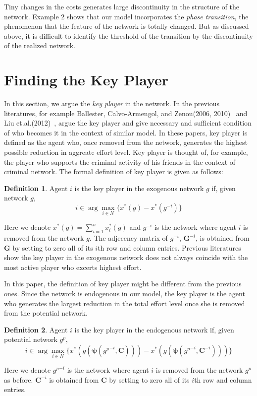 \documentclass[12pt]{article}
\theoremstyle{definition}
\newtheorem{definition}{Definition}
\begin{document}
Tiny changes in the costs generates large discontinuity in the structure of the network.
Example 2 shows that our model incorporates the {\it{phase transition}}, the phenomenon that the feature of the network is totally changed.
But as discussed above, it is difficult to identify the threshold of the transition by the discontinuity of the realized network.


\section{Finding the Key Player}

In this section, we argue the {\it{key player}} in the network.
In the previous literatures, for example Ballester, Calvo-Armengol, and Zenou(2006, 2010)~\cite{whowho, delinquent} and Liu et.al.(2012)~\cite{criminal}, argue the key player and give necessary and sufficient condition of who becomes it in the context of similar model.
In these papers, key player is defined as the agent who, once removed from the network, generates the highest possible reduction in aggreate effort level.
Key player is thought of, for example, the player who supports the criminal activity of his friends in the context of criminal network.
The formal definition of key player is given as follows:

\begin{definition}
Agent $i$ is the key player in the exogenous network $g$ if, given network $g$,
\[ i \in \arg \max_{i \in N} \{ x^*(g) - x^*(g^{-i}) \} \]
\end{definition}

Here we denote $x^*(g) = \sum_{i=1}^n x_i^*(g)$ and $g^{-i}$ is the network where agent $i$ is removed from the network $g$.
The adjecency matrix of $g^{-i}$, $\bm{G}^{-i}$, is obtained from $\bm{G}$ by setting to zero all of its $i$th row and column entries.
Previous literatures show the key player in the exogenous network does not always coincide with the most active player who excerts highest effort.

In this paper, the definition of key player might be different from the previous ones.
Since the network is endogenous in our model, the key player is the agent who generates the largest reduction in the total effort level once she is removed from the potential network.

\begin{definition}
Agent $i$ is the key player in the endogenous network if, given potential network $g^p$,
\[ i \in \arg \max_{i \in N} \{ x^*(g(\bm{\psi}({g^p}^{-i}, \bm{C}))) - x^*(g(\bm{\psi}({g^p}^{-i}, \bm{C}^{-i}))) \} \]
\end{definition}
Here we denote ${g^p}^{-i}$ is the network where agent $i$ is removed from the network $g^p$ as before.
$\bm{C}^{-i}$ is obtained from $\bm{C}$ by setting to zero all of its $i$th row and column entries.
\end{document}
